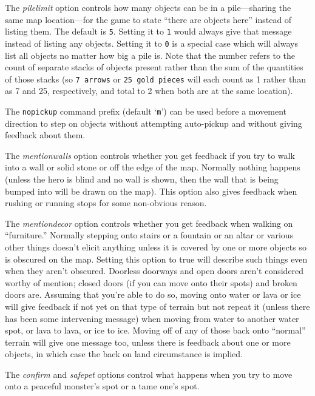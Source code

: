 \documentclass[titlepage]{article}
\begin{document}
The
\textit{pile\textunderscore limit}
option controls how many objects can be in a
pile---sharing the same map location---for
the game to state ``there are objects here'' instead of listing them.
The default is \texttt{5}.
Setting it to \texttt{1} would always give that message instead of listing
any objects.
Setting it to \texttt{0} is a special case which will always list all
objects no matter how big a pile is.
Note that the number refers to the count of separate stacks of objects
present rather than the sum of the quantities of those stacks (so
\texttt{7 arrows} or \texttt{25 gold pieces} will each count as 1 rather
than as 7 and 25, respectively, and total to 2 when both are at the
same location).

The \texttt{nopickup} command prefix (default `\texttt{m}') can be
used before a movement direction to step on objects without attempting
auto-pickup and without giving feedback about them.

The
\textit{mention\textunderscore walls}
option controls whether you get feedback if you try to walk into a wall
or solid stone or off the edge of the map.
Normally nothing happens (unless the hero is blind and no wall is shown,
then the wall that is being bumped into will be drawn on the map).
This option also gives feedback when rushing or running stops for
some non-obvious reason.

The
\textit{mention\textunderscore decor}
option controls whether you get feedback when walking on ``furniture.''
Normally stepping onto stairs or a fountain or an altar or various other
things doesn't elicit anything unless it is covered by one or more objects
so is obscured on the map.
Setting this option to true will describe such things even when they
aren't obscured.
Doorless doorways and open doors aren't considered worthy of mention;
closed doors (if you can move onto their spots) and broken doors are.
Assuming that you're able to do so, moving onto water or lava or ice
will give feedback if not yet on that type of terrain but not repeat it
(unless there has been some intervening message) when moving from water
to another water spot, or lava to lava, or ice to ice.
Moving off of any of those back onto ``normal'' terrain will give one
message too, unless there is feedback about one or more objects, in which
case the back on land circumstance is implied.

The
\textit{confirm}
and
\textit{safe\textunderscore pet}
options control what happens when you try to move onto a peaceful monster's
spot or a tame one's spot.
\end{document}
